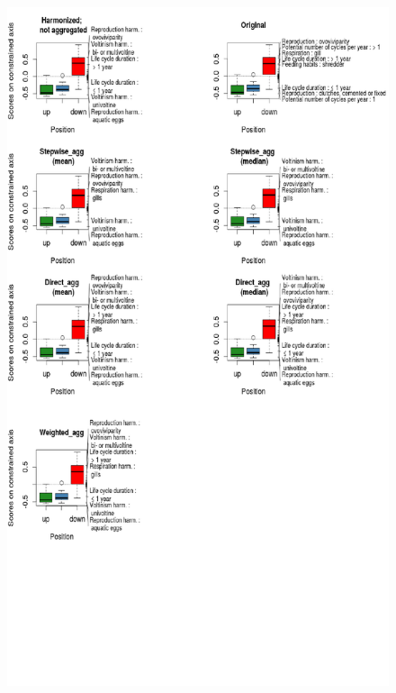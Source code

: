 \documentclass{article}
\begin{document}

\begin{figure}[H]
  \centering
  \includegraphics[width=16.5cm, height=25cm]{Scores_on_constrained_axis_comb_ALT.pdf}
\end{figure}
\end{document}
